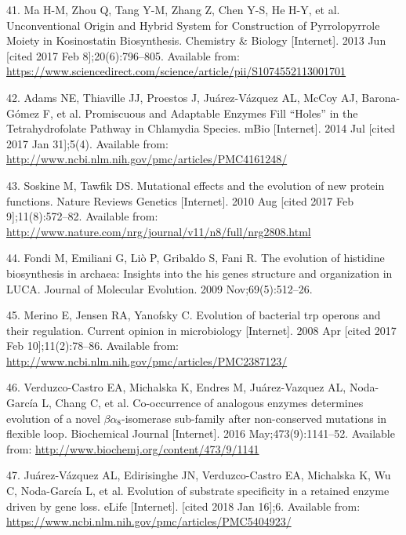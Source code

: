 \documentclass[12pt,twoside]{reedthesis}
\begin{document}
  \hypertarget{ref-ma_unconventional_2013}{}
  41. Ma H-M, Zhou Q, Tang Y-M, Zhang Z, Chen Y-S, He H-Y, et al.
  Unconventional Origin and Hybrid System for Construction of
  Pyrrolopyrrole Moiety in Kosinostatin Biosynthesis. Chemistry \& Biology
  {[}Internet{]}. 2013 Jun {[}cited 2017 Feb 8{]};20(6):796--805.
  Available from:
  \url{https://www.sciencedirect.com/science/article/pii/S1074552113001701}
  
  \hypertarget{ref-adams_promiscuous_2014}{}
  42. Adams NE, Thiaville JJ, Proestos J, Juárez-Vázquez AL, McCoy AJ,
  Barona-Gómez F, et al. Promiscuous and Adaptable Enzymes Fill ``Holes''
  in the Tetrahydrofolate Pathway in Chlamydia Species. mBio
  {[}Internet{]}. 2014 Jul {[}cited 2017 Jan 31{]};5(4). Available from:
  \url{http://www.ncbi.nlm.nih.gov/pmc/articles/PMC4161248/}
  
  \hypertarget{ref-soskine_mutational_2010}{}
  43. Soskine M, Tawfik DS. Mutational effects and the evolution of new
  protein functions. Nature Reviews Genetics {[}Internet{]}. 2010 Aug
  {[}cited 2017 Feb 9{]};11(8):572--82. Available from:
  \url{http://www.nature.com/nrg/journal/v11/n8/full/nrg2808.html}
  
  \hypertarget{ref-fondi_evolution_2009}{}
  44. Fondi M, Emiliani G, Liò P, Gribaldo S, Fani R. The evolution of
  histidine biosynthesis in archaea: Insights into the his genes structure
  and organization in LUCA. Journal of Molecular Evolution. 2009
  Nov;69(5):512--26.
  
  \hypertarget{ref-merino_evolution_2008}{}
  45. Merino E, Jensen RA, Yanofsky C. Evolution of bacterial trp operons
  and their regulation. Current opinion in microbiology {[}Internet{]}.
  2008 Apr {[}cited 2017 Feb 10{]};11(2):78--86. Available from:
  \url{http://www.ncbi.nlm.nih.gov/pmc/articles/PMC2387123/}
  
  \hypertarget{ref-verduzco-castro_co-occurrence_2016}{}
  46. Verduzco-Castro EA, Michalska K, Endres M, Juárez-Vazquez AL,
  Noda-García L, Chang C, et al. Co-occurrence of analogous enzymes
  determines evolution of a novel \(\beta\alpha_8\)-isomerase sub-family
  after non-conserved mutations in flexible loop. Biochemical Journal
  {[}Internet{]}. 2016 May;473(9):1141--52. Available from:
  \url{http://www.biochemj.org/content/473/9/1141}
  
  \hypertarget{ref-juarez-vazquez_evolution_2017}{}
  47. Juárez-Vázquez AL, Edirisinghe JN, Verduzco-Castro EA, Michalska K,
  Wu C, Noda-García L, et al. Evolution of substrate specificity in a
  retained enzyme driven by gene loss. eLife {[}Internet{]}. {[}cited 2018
  Jan 16{]};6. Available from:
  \url{https://www.ncbi.nlm.nih.gov/pmc/articles/PMC5404923/}
  
\end{document}
